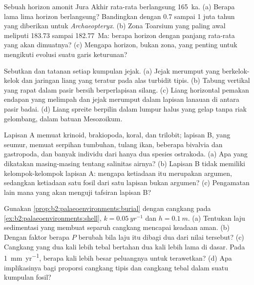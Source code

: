 \begin{exercise}[$\star$]\label{exo:b2:palaeoenvironments:2}
Sebuah horizon amonit Jura Akhir rata-rata berlangsung \qty{165}{ka}. (a) Berapa lama lima horizon
berlangsung? Bandingkan dengan 0.7 sampai 1 juta tahun yang diberikan untuk \emph{Archaeopteryx}. (b) Zona Toarsium
yang paling awal meliputi 183.73 sampai \qty{182.77}{Ma}: berapa horizon dengan panjang rata-rata yang akan dimuatnya?
(c) Mengapa horizon, bukan zona, yang penting untuk mengikuti evolusi suatu garis keturunan?
\end{exercise}

\begin{exercise}[$\star$]\label{exo:b2:palaeoenvironments:3}
Sebutkan  dan tatanan setiap kumpulan jejak. (a) Jejak merumput yang berkelok-kelok dan jaringan liang
yang teratur pada alas turbidit tipis. (b) Tabung vertikal yang rapat dalam pasir bersih
berperlapisan silang. (c) Liang horizontal pemakan endapan yang melimpah dan jejak merumput dalam lapisan
lanauan di antara pasir badai. (d) Liang spreite berpilin dalam lumpur halus yang gelap tanpa riak
gelombang, dalam batuan Mesozoikum.
\end{exercise}

\begin{exercise}[$\star$]\label{exo:b2:palaeoenvironments:4}
Lapisan A memuat krinoid, brakiopoda, koral, dan trilobit; lapisan B, yang seumur, memuat serpihan
tumbuhan, tulang ikan, beberapa bivalvia dan gastropoda, dan banyak individu dari hanya dua spesies
ostrakoda. (a) Apa yang dikatakan masing-masing tentang salinitas airnya? (b) Lapisan B tidak memiliki kelompok-kelompok
lapisan A: mengapa ketiadaan itu merupakan argumen, sedangkan ketiadaan satu fosil dari satu lapisan bukan argumen?
(c) Pengamatan lain mana yang akan menguji tafsiran lapisan B?
\end{exercise}

\begin{exercise}[$\star\star$]\label{exo:b2:palaeoenvironments:5}
Gunakan \cref{prop:b2:palaeoenvironments:burial} dengan cangkang pada
\cref{ex:b2:palaeoenvironments:shell}, $k = \qty{0.05}{yr^{-1}}$ dan $h = \qty{0.1}{m}$. (a)
Tentukan laju sedimentasi yang membuat separuh cangkang mencapai keadaan aman. (b) Dengan faktor berapa $P$
berubah bila laju itu dibagi dua dari nilai tersebut? (c) Cangkang yang dua kali lebih tebal bertahan dua kali lebih lama
di dasar. Pada \qty{1}{mm.yr^{-1}}, berapa kali lebih besar peluangnya untuk terawetkan? (d) Apa
implikasinya bagi proporsi cangkang tipis dan cangkang tebal dalam suatu kumpulan fosil?
\end{exercise}

